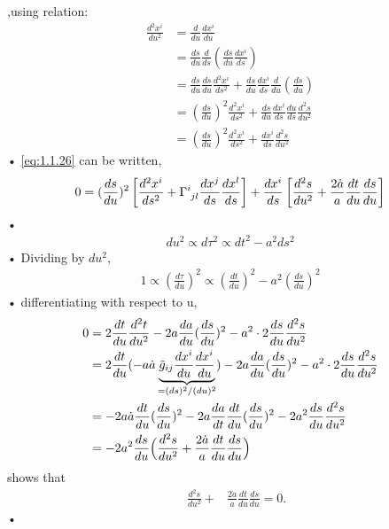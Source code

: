 \documentclass[11pt,a4paper,dvipdfmx]{jsarticle}
\theoremstyle{plain}
\theoremstyle{break}
\newcommand{\tilg}{\tilde{g}}
\newcommand{\tensorGamma}[1]{\tensor{\Gamma}{ #1}}
\begin{document}
,using relation:
\begin{align}
\frac{d^2 x^i}{du^2}
&= \frac{d}{du} \frac{dx^i}{du} \\
&=\frac{ds}{du} \frac{d}{ds} (\frac{ds}{du} \frac{dx^i}{ds} )\\
&=\frac{ds}{du}\frac{ds}{du}\frac{d^2 x^i}{ds^2} +\frac{ds}{du} \frac{dx^i}{ds}\frac{d}{du} (\frac{ds}{du}) \\
&=(\frac{ds}{du})^2 \frac{d^2x^i}{ds^2} + \frac{ds}{du}\frac{dx^i}{ds}\frac{du}{ds} \frac{d^2s}{du^2} \\
&=(\frac{ds}{du})^2 \frac{d^2x^i}{ds^2} + \frac{dx^i}{ds} \frac{d^2s}{du^2}
\end{align}•%
\eqref{eq:1.1.26} can be written,
\begin{align}
0 = (\frac{ds}{du})^2 \left[ \frac{d^2 x^i}{ds^2} + \tensorGamma{^i_{jl}} \frac{dx^j}{ds}\frac{dx^l}{ds} \right] + \frac{dx^i}{ds} \left[ \frac{d^2 s}{du^2} + \frac{2 \dot{a}}{a} \frac{dt}{du}\frac{ds}{du} \right]
\end{align}•%
\begin{align}
du^2 \propto d\tau^2 \propto dt^2 - a^2 ds^2
\end{align}•%
Dividing by $du^2$,
\begin{align}
1
\propto (\frac{d\tau}{du})^2
\propto (\frac{dt}{du})^2 -a^2 (\frac{ds}{du})^2
\end{align}•%
 differentiating with respect to u,
\begin{align}
0
&= 2\frac{dt}{du} \frac{d^2t}{du^2}
      - 2a \frac{da}{du}  (\frac{ds}{du})^2 - a^2 \cdot 2\frac{ds}{du} \frac{d^2 s}{du^2} \\
&= 2\frac{dt}{du} (- a \dot{a} \underbrace{\tilg_{ij} \frac{dx^i}{du}\frac{dx^i}{du} }_{= (ds)^2/(du)^2} )
      - 2a \frac{da}{du}  (\frac{ds}{du})^2 - a^2 \cdot 2\frac{ds}{du} \frac{d^2 s}{du^2} \\
&=-2 a \dot{a} \frac{dt}{du} (\frac{ds}{du})^2  - 2 a \frac{da}{dt} \frac{dt}{du} (\frac{ds}{du})^2 -2a^2 \frac{ds}{du} \frac{d^2 s}{du^2}\\
&=-2 a^2 \frac{ds}{du} \Bigl( \frac{d^2s}{du^2} + \frac{2\dot{a}}{a} \frac{dt}{du} \frac{ds}{du}\Bigr)
\end{align}
shows that
\begin{align}
\quad \frac{d^2s}{du^2} + &\frac{2 \dot{a}}{a} \frac{dt}{du} \frac{ds}{du} = 0.
\end{align}•%
\end{document}
